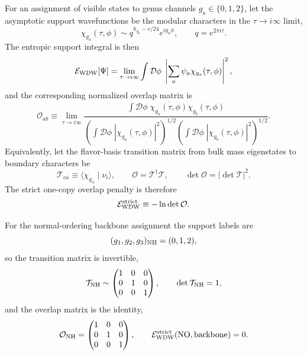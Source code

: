 \documentclass[11pt]{article}
\begin{document}
For an assignment of visible states to genus channels $g_a\in\{0,1,2\}$, let the asymptotic support wavefunctions be the modular characters in the $\tau\to i\infty$ limit,
\begin{equation}
 \chi_{g_a}(\tau,\phi)
 \sim
 q^{h_{g_a}-c/24}e^{ig_a\phi},
 \qquad
 q=e^{2\pi i\tau}.
\end{equation}
The entropic support integral is then
\begin{equation}
 \mathcal E_{\rm WDW}[\Psi]
 =
 \lim_{\tau\to i\infty}
 \int \mathcal D\phi\;
 \left|\sum_a \psi_a\chi_{g_a}(\tau,\phi)\right|^2,
\end{equation}
and the corresponding normalized overlap matrix is
\begin{equation}
 \mathcal O_{ab}
 \equiv
 \lim_{\tau\to i\infty}
 \frac{\int \mathcal D\phi\;\overline{\chi_{g_a}(\tau,\phi)}\chi_{g_b}(\tau,\phi)}
 {\left(\int \mathcal D\phi\;|\chi_{g_a}(\tau,\phi)|^2\right)^{1/2}
 \left(\int \mathcal D\phi\;|\chi_{g_b}(\tau,\phi)|^2\right)^{1/2}}.
\end{equation}
Equivalently, let the flavor-basis transition matrix from bulk mass eigenstates to boundary characters be
\begin{equation}
 \mathcal T_{\alpha i}
 \equiv
 \langle \chi_{g_{\alpha}}\mid\nu_i\rangle,
 \qquad
 \mathcal O=\mathcal T^{\dagger}\mathcal T,
 \qquad
 \det\mathcal O=|\det\mathcal T|^2.
\end{equation}
The strict one-copy overlap penalty is therefore
\begin{equation}
 \mathcal E_{\rm WDW}^{\rm strict}
 \equiv
 -\ln\det \mathcal O.
\end{equation}

For the normal-ordering backbone assignment the support labels are
\begin{equation}
 (g_1,g_2,g_3)_{\rm NH}=(0,1,2),
\end{equation}
so the transition matrix is invertible,
\begin{equation}
 \mathcal T_{\rm NH}\sim
 \begin{pmatrix}
  1 & 0 & 0 \\
  0 & 1 & 0 \\
  0 & 0 & 1
 \end{pmatrix},
 \qquad
 \det\mathcal T_{\rm NH}=1,
\end{equation}
and the overlap matrix is the identity,
\begin{equation}
 \mathcal O_{\rm NH}=
 \begin{pmatrix}
  1 & 0 & 0 \\
  0 & 1 & 0 \\
  0 & 0 & 1
 \end{pmatrix},
 \qquad
 \mathcal E_{\rm WDW}^{\rm strict}(\mathrm{NO,backbone})=0.
\end{equation}
\end{document}

